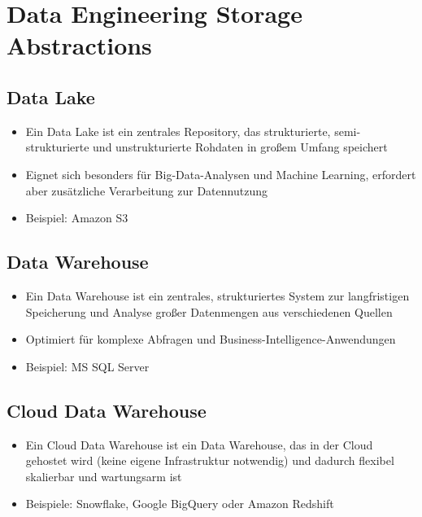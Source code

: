 \documentclass[11pt]{scrartcl}
\begin{document}
\tableofcontents 

\newpage
\section{Data Engineering Storage Abstractions}
\subsection{Data Lake}
\begin{itemize}
	\item Ein Data Lake ist ein zentrales Repository, das strukturierte, semi-strukturierte und unstrukturierte Rohdaten in großem Umfang speichert
	\item Eignet sich besonders für Big-Data-Analysen und Machine Learning, erfordert aber zusätzliche Verarbeitung zur Datennutzung
	\item Beispiel: Amazon S3
\end{itemize}


\subsection{Data Warehouse}
\begin{itemize}
	\item Ein Data Warehouse ist ein zentrales, strukturiertes System zur langfristigen Speicherung und Analyse großer Datenmengen aus verschiedenen Quellen
	\item Optimiert für komplexe Abfragen und Business-Intelligence-Anwendungen
	\item Beispiel: MS SQL Server
\end{itemize}


\subsection{Cloud Data Warehouse}
\begin{itemize}
	\item Ein Cloud Data Warehouse ist ein Data Warehouse, das in der Cloud gehostet wird (keine eigene Infrastruktur notwendig) und dadurch flexibel skalierbar und wartungsarm ist
	\item Beispiele: Snowflake, Google BigQuery oder Amazon Redshift
\end{itemize}
\end{document}

